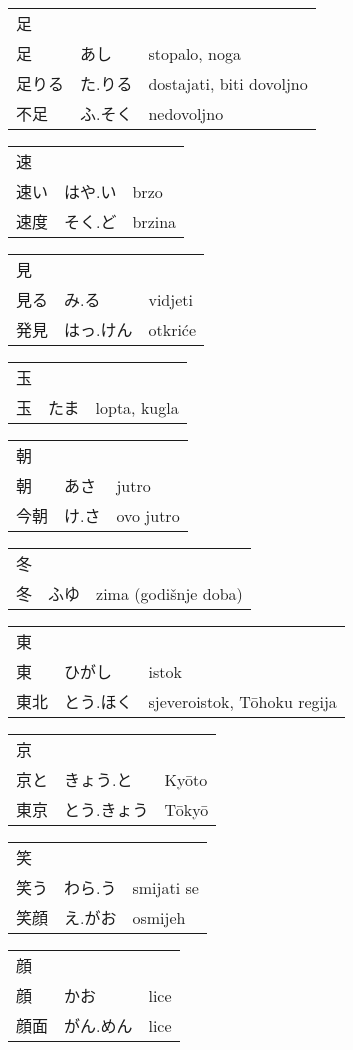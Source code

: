 

\newenvironment{dictentry}[1]{
	\begin{tabular}{p{2cm} p{3cm} p{10cm}}
		#1 &&\\
}{
	\end{tabular}
	\vspace{20pt}
}

\newcommand{\example}[3]{
	\hspace*{\fill}#1 & #2 & #3\\
}

\author{ロボット君}


\begin{dictentry}{足}
\example{足}{あし}{stopalo, noga}
\example{足りる}{た.りる}{dostajati, biti dovoljno}
\example{不足}{ふ.そく}{nedovoljno}
\end{dictentry}

\begin{dictentry}{速}
\example{速い}{はや.い}{brzo}
\example{速度}{そく.ど}{brzina}
\end{dictentry}

\begin{dictentry}{見}
\example{見る}{み.る}{vidjeti}
\example{発見}{はっ.けん}{otkriće}
\end{dictentry}

\begin{dictentry}{玉}
\example{玉}{たま}{lopta, kugla}
\end{dictentry}

\begin{dictentry}{朝}
\example{朝}{あさ}{jutro}
\example{今朝}{け.さ \footnotemark[1]}{ovo jutro}
\end{dictentry}

\begin{dictentry}{冬}
\example{冬}{ふゆ}{zima (godišnje doba)}
\end{dictentry}

\begin{dictentry}{東}
\example{東}{ひがし}{istok}
\example{東北}{とう.ほく}{sjeveroistok, Tōhoku regija}
\end{dictentry}

\begin{dictentry}{京}
\example{京と}{きょう.と}{Kyōto}
\example{東京}{とう.きょう}{Tōkyō}
\end{dictentry}

\begin{dictentry}{笑}
\example{笑う}{わら.う}{smijati se}
\example{笑顔}{え.がお}{osmijeh}
\end{dictentry}

\begin{dictentry}{顔}
\example{顔}{かお}{lice}
\example{顔面}{がん.めん}{lice}
\end{dictentry}


